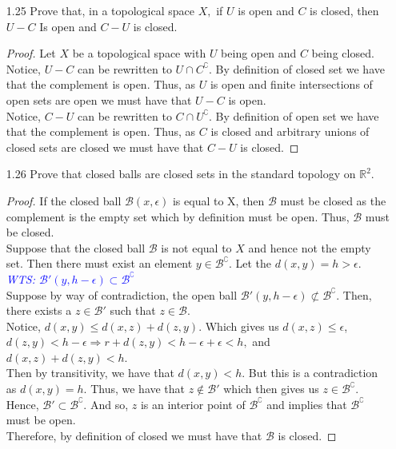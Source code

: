 \documentclass[12pt]{article}
\newcommand{\BB}{\mathcal{B}}
\newcommand{\wts}[1]{\textit{\textcolor{blue}{WTS: #1}}\\}
\begin{document}
	\begin{enumerate}
		
		\item[1.25] Prove that, in a topological space $X,$ if $U$ is open and $C$ is closed, then $U-C$ Is open and $C-U$ is closed.
		\begin{proof}
		Let $ X $ be a topological space with $ U $ being open and $ C $ being closed.\\
		Notice, $ U-C $ can be rewritten to $ U\cap C^{\complement} $. By definition of closed set we have that the complement is open. Thus, as $ U $ is open and finite intersections of open sets are open we must have that $ U-C $ is open.\\
		Notice, $ C-U $ can be rewritten to $ C\cap U^{\complement} $. By definition of open set we have that the complement is open. Thus, as $ C $ is closed and arbitrary unions of closed sets are closed we must have that $ C-U $ is closed.
		\end{proof}
		\item[1.26] Prove that closed balls are closed sets in the standard topology on $\mathbb{R}^{2}$.\\
		\begin{proof}
		If the closed ball $ \BB(x,\epsilon)$ is equal to X, then $ \BB $ must be closed as the complement is the empty set which by definition must be open. Thus, $ \BB $ must be closed. \\
		Suppose that the closed ball $ \BB $ is not equal to $ X $ and hence not the empty set.
		Then there must exist an element $ y\in \BB^\complement $. Let the $ d(x,y) = h > \epsilon $.\\
		\wts{$\BB'(y,h-\epsilon) \subset \BB^\complement$}
		Suppose by way of contradiction, the open ball $\BB'(y,h-\epsilon) \not\subset \BB^\complement$. Then, there exists a $ z\in \BB' $ such that $ z\in\BB $.\\
		Notice, $ d(x,y)\leq d(x,z)+d(z,y) $. Which gives us $ d(x,z)\leq \epsilon$, $d(z,y) < h-\epsilon \Rightarrow r+d(z,y)<h-\epsilon+\epsilon<h, $ and $ d(x,z)+d(z,y)<h$.\\
		Then by transitivity, we have that $d(x,y)<h$. But this is a contradiction as $d(x,y)=h$. Thus, we have that $ z \not\in \BB' $ which then gives us $ z\in \BB^\complement $. Hence, $ \BB' \subset \BB^\complement $. And so, $ z $ is an interior point of $ \BB^\complement $ and implies that $ \BB^\complement $ must be open.\\ Therefore, by definition of closed we must have that $ \BB $ is closed.

\end{proof}
\end{enumerate}
\end{document}
